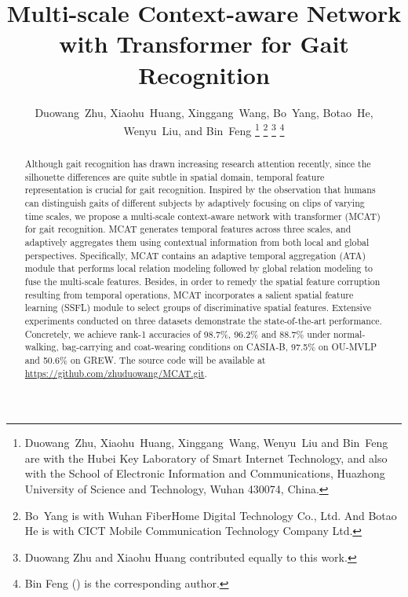 \documentclass[journal]{IEEEtran}
\begin{document}
\title{Multi-scale Context-aware Network with Transformer for Gait Recognition}

\author{Duowang~Zhu, Xiaohu~Huang, Xinggang~Wang, Bo~Yang, Botao~He, Wenyu~Liu, and Bin~Feng
\thanks{Duowang~Zhu, Xiaohu~Huang, Xinggang~Wang, Wenyu~Liu and Bin~Feng are with the Hubei Key Laboratory of Smart Internet Technology, and also with the School of Electronic Information and Communications, Huazhong University of Science and Technology, Wuhan 430074, China.
}
\thanks{Bo~Yang is with Wuhan FiberHome Digital Technology Co., Ltd. And Botao He is with CICT Mobile Communication Technology Company Ltd.}
\thanks{Duowang Zhu and Xiaohu Huang contributed equally to this work.}
\thanks{Bin Feng () is the corresponding author.}}




\maketitle

\begin{abstract}
Although gait recognition has drawn increasing research attention recently, since the silhouette differences are quite subtle in spatial domain, temporal feature representation is crucial for gait recognition. Inspired by the observation that humans can distinguish gaits of different subjects by adaptively focusing on clips of varying time scales, we propose a multi-scale context-aware network with transformer (MCAT) for gait recognition. MCAT generates temporal features across three scales, and adaptively aggregates them using contextual information from both local and global perspectives. Specifically, MCAT contains an adaptive temporal aggregation (ATA) module that performs local relation modeling followed by global relation modeling to fuse the multi-scale features. Besides, in order to remedy the spatial feature corruption resulting from temporal operations, MCAT incorporates a salient spatial feature learning (SSFL) module to select groups of discriminative spatial features. Extensive experiments conducted on three datasets demonstrate the state-of-the-art performance. Concretely, we achieve rank-1 accuracies of 98.7\%, 96.2\% and 88.7\% under normal-walking, bag-carrying and coat-wearing conditions on CASIA-B, 97.5\% on OU-MVLP and 50.6\% on GREW. The source code will be available at \url{https://github.com/zhuduowang/MCAT.git}.
\end{abstract}
\end{document}
